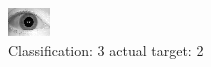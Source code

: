 \begin{figure}[h!]
\begin{center}
\includegraphics[width=0.60\columnwidth]{figures/ID1774_class_3_target_2.png}
\end{center}
\caption{ Classification: 3 actual target: 2}
\label{fig:ID1774_class_3_target_2}
\end{figure}
